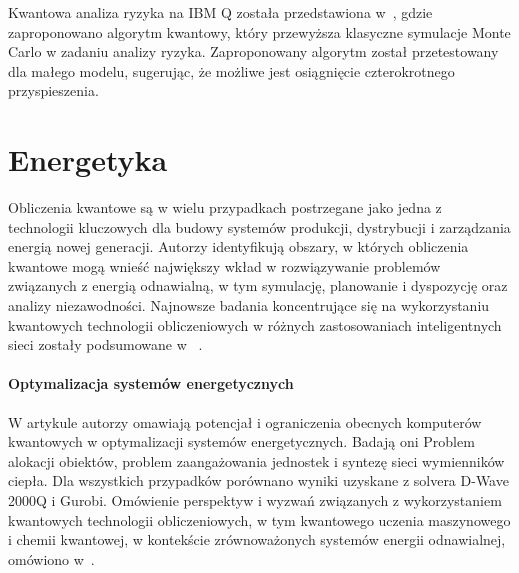 \documentclass[a4paper,11pt]{article}
\begin{document}
Kwantowa analiza ryzyka na IBM Q została przedstawiona w~\cite{woerner2019quantum}, gdzie zaproponowano algorytm kwantowy, który przewyższa klasyczne symulacje Monte Carlo w zadaniu analizy ryzyka.  Zaproponowany algorytm został
przetestowany dla małego modelu, sugerując, że możliwe jest osiągnięcie czterokrotnego przyspieszenia.


\section{Energetyka}

Obliczenia kwantowe są w wielu przypadkach postrzegane jako jedna z technologii kluczowych dla budowy systemów produkcji, dystrybucji i zarządzania energią nowej generacji. Autorzy \cite{giani2021quantum} identyfikują obszary, w których obliczenia kwantowe mogą wnieść największy wkład w rozwiązywanie problemów związanych z energią odnawialną, w tym symulację, planowanie i dyspozycję oraz analizy niezawodności. Najnowsze badania koncentrujące się na wykorzystaniu kwantowych technologii obliczeniowych w różnych zastosowaniach inteligentnych sieci zostały podsumowane w ~\cite{ullah2022quantum}.


\paragraph{Optymalizacja systemów energetycznych}

W artykule \cite{ajagekar2019quantum} autorzy omawiają potencjał i ograniczenia obecnych komputerów kwantowych w optymalizacji systemów energetycznych. Badają oni 
Problem alokacji obiektów, problem zaangażowania jednostek i syntezę sieci wymienników ciepła. Dla wszystkich przypadków porównano wyniki uzyskane z solvera D-Wave 2000Q i Gurobi.
Omówienie perspektyw i wyzwań związanych z wykorzystaniem kwantowych technologii obliczeniowych, w tym kwantowego uczenia maszynowego i chemii kwantowej, w kontekście zrównoważonych systemów energii odnawialnej, omówiono w~\cite{ajagekar2022quantum}.
\end{document}
